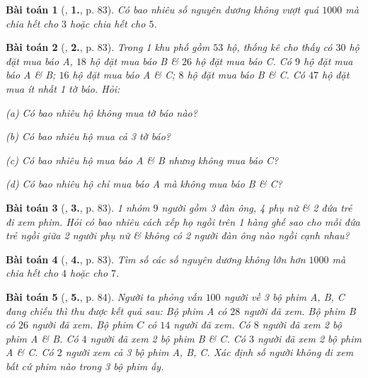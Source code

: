 \documentclass{article}
\numberwithin{equation}{section}
\newtheorem{baitoan}{Bài toán}[section]
\begin{document}
\begin{baitoan}[\cite{TL_chuyen_Toan_Dai_So_Giai_Tich_11}, \textbf{1.}, p. 83]
	Có bao nhiêu số nguyên dương không vượt quá $1000$ mà chia hết cho $3$ hoặc chia hết cho $5$.
\end{baitoan}

\begin{baitoan}[\cite{TL_chuyen_Toan_Dai_So_Giai_Tich_11}, \textbf{2.}, p. 83]
	Trong 1 khu phố gồm $53$ hộ, thống kê cho thấy có $30$ hộ đặt mua báo A, $18$ hộ đặt mua báo B \& $26$ hộ đặt mua báo C. Có $9$ hộ đặt mua báo A \& B; $16$ hộ đặt mua báo A \& C; $8$ hộ đặt mua báo B \& C. Có $47$ hộ đặt mua ít nhất 1 tờ báo. Hỏi:
	\begin{enumerate*}
		\item[(a)] Có bao nhiêu hộ không mua tờ báo nào?
		\item[(b)] Có bao nhiêu hộ mua cả 3 tờ báo?
		\item[(c)] Có bao nhiêu hộ mua báo A \& B nhưng không mua báo C?
		\item[(d)] Có bao nhiêu hộ chỉ mua báo A mà không mua báo B \& C?
	\end{enumerate*}
\end{baitoan}

\begin{baitoan}[\cite{TL_chuyen_Toan_Dai_So_Giai_Tich_11}, \textbf{3.}, p. 83]
	1 nhóm $9$ người gồm 3 đàn ông, 4 phụ nữ \& 2 đứa trẻ đi xem phim. Hỏi có bao nhiêu cách xếp họ ngồi trên 1 hàng ghế sao cho mỗi đứa trẻ ngồi giữa 2 người phụ nữ \& không có 2 người đàn ông nào ngồi cạnh nhau?
\end{baitoan}

\begin{baitoan}[\cite{TL_chuyen_Toan_Dai_So_Giai_Tich_11}, \textbf{4.}, p. 83]
	Tìm số các số nguyên dương không lớn hơn $1000$ mà chia hết cho $4$ hoặc cho $7$.
\end{baitoan}

\begin{baitoan}[\cite{TL_chuyen_Toan_Dai_So_Giai_Tich_11}, \textbf{5.}, p. 84]
	Người ta phỏng vấn $100$ người về 3 bộ phim A, B, C đang chiếu thì thu được kết quả sau: Bộ phim A có $28$ người đã xem. Bộ phim B có $26$ người đã xem. Bộ phim $C$ có $14$ người đã xem. Có $8$ người đã xem 2 bộ phim A \& B. Có $4$ người đã xem 2 bộ phim B \& C. Có $3$ người đã xem 2 bộ phim A \& C. Có $2$ người xem cả 3 bộ phim A, B, C. Xác định số người không đi xem bất cứ phim nào trong 3 bộ phim ấy.
\end{baitoan}
\end{document}

